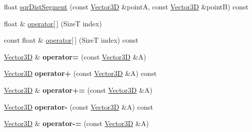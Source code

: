 \begin{DoxyCompactItemize}
\item 
float \hyperlink{classdrider_s_d_k_1_1_vector3_d_a17428bbe32652edcba681b55e27853b2}{sqr\+Dist\+Segment} (const \hyperlink{classdrider_s_d_k_1_1_vector3_d}{Vector3D} \&pointA, const \hyperlink{classdrider_s_d_k_1_1_vector3_d}{Vector3D} \&pointB) const
\item 
float \& \hyperlink{classdrider_s_d_k_1_1_vector3_d_ac7f67c8043cc9f9d801a7e7a2f2580a7}{operator\mbox{[}$\,$\mbox{]}} (SizeT index)
\item 
const float \& \hyperlink{classdrider_s_d_k_1_1_vector3_d_a54c01f85259ba8f84eb37dcf1001e59e}{operator\mbox{[}$\,$\mbox{]}} (SizeT index) const
\item 
\mbox{\label{classdrider_s_d_k_1_1_vector3_d_a6f290466b4c2583b0687861372bd6bd2}} 
\hyperlink{classdrider_s_d_k_1_1_vector3_d}{Vector3D} \& {\bfseries operator=} (const \hyperlink{classdrider_s_d_k_1_1_vector3_d}{Vector3D} \&A)
\item 
\mbox{\label{classdrider_s_d_k_1_1_vector3_d_a070a52602fede494fe8001dbbcdb7b82}} 
\hyperlink{classdrider_s_d_k_1_1_vector3_d}{Vector3D} {\bfseries operator+} (const \hyperlink{classdrider_s_d_k_1_1_vector3_d}{Vector3D} \&A) const
\item 
\mbox{\label{classdrider_s_d_k_1_1_vector3_d_ae5d5813d5376850d0a9a8c3f7af02c44}} 
\hyperlink{classdrider_s_d_k_1_1_vector3_d}{Vector3D} \& {\bfseries operator+=} (const \hyperlink{classdrider_s_d_k_1_1_vector3_d}{Vector3D} \&A)
\item 
\mbox{\label{classdrider_s_d_k_1_1_vector3_d_a04bdf7e8cb2ccc0b88dc521a6d5f0293}} 
\hyperlink{classdrider_s_d_k_1_1_vector3_d}{Vector3D} {\bfseries operator-\/} (const \hyperlink{classdrider_s_d_k_1_1_vector3_d}{Vector3D} \&A) const
\item 
\mbox{\label{classdrider_s_d_k_1_1_vector3_d_aec4620baccb156f4e3fa55714fb6f447}} 
\hyperlink{classdrider_s_d_k_1_1_vector3_d}{Vector3D} \& {\bfseries operator-\/=} (const \hyperlink{classdrider_s_d_k_1_1_vector3_d}{Vector3D} \&A)
\item 
\mbox{\label{classdrider_s_d_k_1_1_vector3_d_a01533415912b63ad5b9d63990b08414c}} 

\end{DoxyCompactItemize}
